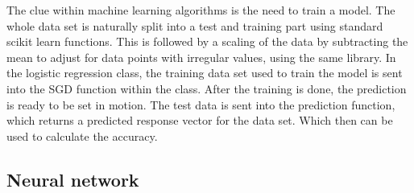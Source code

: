 \documentclass[../main.tex]{subfiles}
\begin{document}
The clue within machine learning algorithms is the need to train a model. The whole data set is naturally split into a test and training part using standard scikit learn functions. This is followed by a scaling of the data by subtracting the mean to adjust for data points with irregular values, using the same library. In the logistic regression class, the training data set used to train the model is sent into the SGD function within the class. After the training is done, the prediction is ready to be set in motion. The test data is sent into the prediction function, which returns a predicted response vector for the data set. Which then can be used to calculate the accuracy.

\subsection{Neural network}
\end{document}
